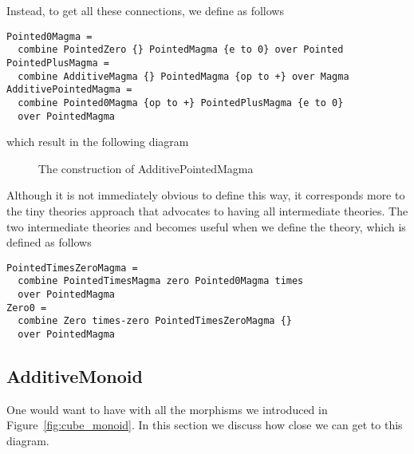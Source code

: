 Instead, to get all these connections, we define  as follows 
\begin{lstlisting}
Pointed0Magma = 
  combine PointedZero {} PointedMagma {e to 0} over Pointed
PointedPlusMagma = 
  combine AdditiveMagma {} PointedMagma {op to +} over Magma
AdditivePointedMagma = 
  combine Pointed0Magma {op to +} PointedPlusMagma {e to 0} 
  over PointedMagma
\end{lstlisting}
which result in the following diagram 
\begin{figure}[h]
    \caption{The construction of AdditivePointedMagma}
    \label{fig:addPointedMagmaReal}
\end{figure}
Although it is not immediately obvious to define  this way, it corresponds more to the tiny theories approach that advocates to having all intermediate theories. The two intermediate theories  and  becomes useful when we define the  theory, which is defined as follows 
\begin{lstlisting}
PointedTimesZeroMagma = 
  combine PointedTimesMagma zero Pointed0Magma times 
  over PointedMagma 
Zero0 = 
  combine Zero times-zero PointedTimesZeroMagma {} 
  over PointedMagma 
\end{lstlisting}

\subsection{AdditiveMonoid}
One would want to have  with all the morphisms we introduced in Figure~\ref{fig:cube_monoid}. In this section we discuss how close we can get to this diagram. 

